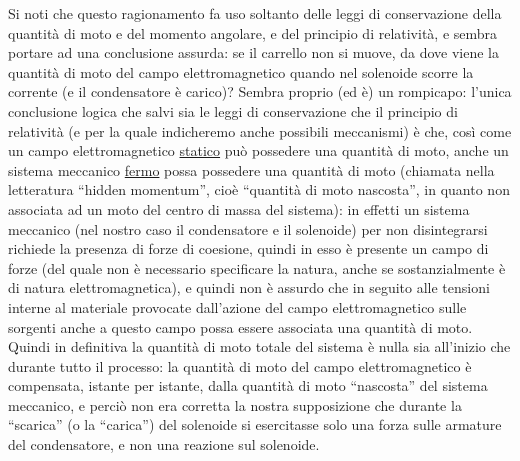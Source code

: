 Si noti che questo ragionamento fa uso soltanto delle leggi di conservazione
della quantit\`a di moto e del momento angolare, e del principio di
relativit\`a, e sembra portare ad una conclusione assurda: se il carrello non si
muove, da dove viene la quantit\`a di moto del campo elettromagnetico quando nel
solenoide scorre la corrente (e il condensatore \`e carico)? Sembra proprio (ed
\`e) un rompicapo: l'unica conclusione logica che salvi sia le leggi di
conservazione che il principio di relativit\`a (e per la quale indicheremo anche
possibili meccanismi) \`e che, cos\`i come un campo elettromagnetico
\underline{statico} pu\`o possedere una quantit\`a di moto, anche un sistema
meccanico \underline{fermo} possa possedere una quantit\`a di moto (chiamata
nella letteratura ``hidden momentum'', cio\`e ``quantit\`a di moto nascosta'',
in quanto non associata ad un moto del centro di massa del sistema): in effetti
un sistema meccanico (nel nostro caso il condensatore e il solenoide) per non
disintegrarsi richiede la presenza di forze di coesione, quindi in esso \`e
presente un campo di forze (del quale non \`e necessario specificare la natura,
anche se sostanzialmente \`e di natura elettromagnetica), e quindi non \`e
assurdo che in seguito alle tensioni interne al materiale provocate dall'azione
del campo elettromagnetico sulle sorgenti anche a questo campo possa essere
associata una quantit\`a di moto. Quindi in definitiva la quantit\`a di moto
totale del sistema \`e nulla sia all'inizio che durante tutto il processo: la
quantit\`a di moto del campo elettromagnetico \`e compensata, istante per
istante, dalla quantit\`a di moto ``nascosta'' del sistema meccanico, e perci\`o
non era corretta la nostra supposizione che durante la ``scarica'' (o la
``carica'') del solenoide si esercitasse solo una forza sulle armature del
condensatore, e non una reazione sul solenoide.


